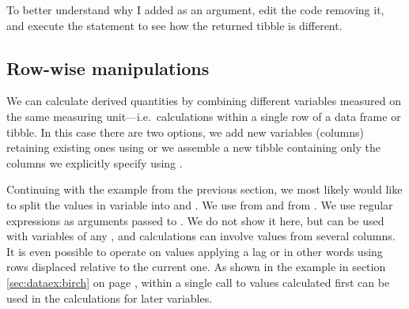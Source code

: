\documentclass[krantz2]{krantz}\usepackage{knitr}%
\begin{document}
\begin{playground}
To better understand why I added  as an argument, edit the code removing it, and execute the statement to see how the returned tibble is different.
\end{playground}

\subsection{Row-wise manipulations}

We can calculate derived quantities by combining different variables measured on the same measuring unit---i.e.\ calculations within a single row of a data frame or tibble. In this case there are two options, we add new variables (columns) retaining existing ones using  or we assemble a new tibble containing only the columns we explicitly specify using .

Continuing with the example from the previous section, we most likely would like to split the values in variable  into  and . We use  from  and  from . We use regular expressions as arguments passed to .  We do not show it here, but  can be used with variables of any , and calculations can involve values from several columns. It is even possible to operate on values applying a lag or in other words using rows displaced relative to the current one. As shown in the example in section \ref{sec:dataex:birch} on page \pageref{sec:dataex:birch}, within a single call to  values calculated first can be used in the calculations for later variables.
\end{document}
